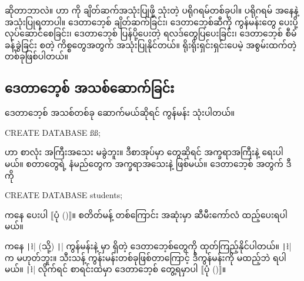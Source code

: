  ဆိုတာဘာလဲ။  ဟာ  ကို ချိတ်ဆက်အသုံးပြုဖို့ သုံးတဲ့  ပရိုဂရမ်တစ်ခုပါ။  ပရိုဂရမ် အနေနဲ့ အသုံးပြုရတာပါ။ ဒေတာဘေ့စ် ချိတ်ဆက်ခြင်း၊ ဒေတာဘေ့စ်ဆီကို  ကွန်မန်းတွေ ပေးပို့လုပ်ဆောင်စေခြင်း၊ ဒေတာဘေ့စ် ပြန်ပို့ပေးတဲ့ ရလဒ်တွေပြပေးခြင်း၊ ဒေတာဘေ့စ် စီမံခန့်ခွဲခြင်း  စတဲ့ ကိစ္စတွေအတွက် အသုံးပြုနိုင်တယ်။ ရိုးရိုးရှင်းရှင်းပေမဲ့ အစွမ်းထက်တဲ့  တစ်ခုဖြစ်ပါတယ်။

\subsection*{ဒေတာဘေ့စ် အသစ်ဆောက်ခြင်း}
ဒေတာဘေ့စ် အသစ်တစ်ခု ဆောက်မယ်ဆိုရင်   ကွန်မန်း သုံးပါတယ်။  
%
\begin{sql}
CREATE DATABASE ßß;
\end{sql}
%
 ဟာ စာလုံး အကြီးအသေး မခွဲဘူး။ ဒီစာအုပ်မှာ  တွေဆိုရင် အက္ခရာအကြီးနဲ့ ရေးပါမယ်။  စတာတွေရဲ့ နံမည်တွေက အက္ခရာအသေးနဲ့ ဖြစ်မယ်။
 ဒေတာဘေ့စ် အတွက် ဒီ  ကို
%
\begin{sql}
CREATE DATABASE students;
\end{sql}
%
 ကနေ  ပေးပါ $\big\llbracket$ပုံ (\fRefNo{\ref{fig:createdb}})$\big\rrbracket$။  စတိတ်မန့် တစ်ကြောင်း အဆုံးမှာ ဆီမီးကော်လံ \fEn{(\fCode{;})} ထည့်ပေးရပါမယ်။

\begin{figure}[tb!]
\caption{}
\label{fig:createdb}
\end{figure}

 ကနေ \texttt|\l| (သို့) \texttt|\list| ကွန်မန်းနဲ့  မှာ ရှိတဲ့ ဒေတာဘေ့စ်တွေကို ထုတ်ကြည့်နိုင်ပါတယ်။ \texttt|\l| က  မဟုတ်ဘူး။  သီးသန့် ကွန်းမန်းတစ်ခုဖြစ်တာကြောင့် ဒီကွန်မန်းကို \fCode{;} မထည့်ဘဲ  ရပါမယ်။ \texttt|\l|  လိုက်ရင် စာရင်းထဲမှာ  ဒေတာဘေ့စ် တွေ့ရမှာပါ $\big\llbracket$ပုံ (\fRefNo{\ref{fig:listdb}})$\big\rrbracket$။


